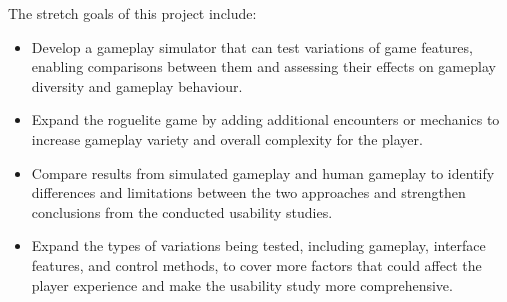 The stretch goals of this project include:

\begin{itemize}

    \item Develop a gameplay simulator that can test variations of game features, enabling comparisons between them and assessing their effects on gameplay diversity and gameplay behaviour.

    \item Expand the roguelite game by adding additional encounters or mechanics to increase gameplay variety and overall complexity for the player.

    \item Compare results from simulated gameplay and human gameplay to identify differences and limitations between the two approaches and strengthen conclusions from the conducted usability studies.

    \item Expand the types of variations being tested, including gameplay, interface features, and control methods, to cover more factors that could affect the player experience and make the usability study more comprehensive.

\end{itemize}